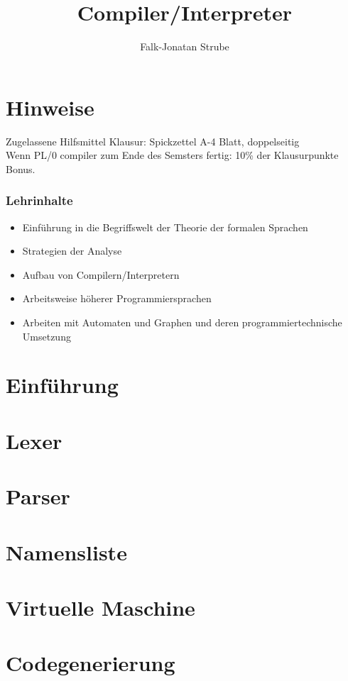 \documentclass{scrreprt}
\title{Compiler/Interpreter}
\author{Falk-Jonatan Strube}
\begin{document}
\maketitle
\tableofcontents

\chapter*{Hinweise}

Zugelassene Hilfsmittel Klausur: Spickzettel A-4 Blatt, doppelseitig\\
Wenn PL/0 compiler zum Ende des Semsters fertig: 10\% der Klausurpunkte Bonus.

\subsection*{Lehrinhalte}
\begin{itemize}
\item Einführung in die Begriffswelt der Theorie der formalen Sprachen
\item Strategien der Analyse
\item Aufbau von Compilern/Interpretern
\item Arbeitsweise höherer Programmiersprachen
\item Arbeiten mit Automaten und Graphen und deren programmiertechnische Umsetzung
\end{itemize}

\chapter{Einführung}


%

\chapter{Lexer}


\chapter{Parser}


\chapter{Namensliste}


\chapter{Virtuelle Maschine}


\chapter{Codegenerierung}

\end{document}
